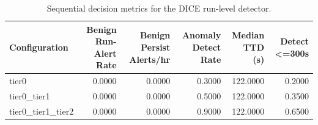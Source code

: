 \begin{table}[t]
\centering
\caption{Sequential decision metrics for the DICE run-level detector.}
\label{tab:dice_sequential_metrics}
\footnotesize
\begin{tabular}{lrrrrr}
\toprule
Configuration & Benign Run-Alert Rate & Benign Persist Alerts/hr & Anomaly Detect Rate & Median TTD (s) & Detect <=300s \\
\midrule
tier0 & 0.0000 & 0.0000 & 0.3000 & 122.0000 & 0.2000 \\
tier0_tier1 & 0.0000 & 0.0000 & 0.5000 & 122.0000 & 0.3500 \\
tier0_tier1_tier2 & 0.0000 & 0.0000 & 0.9000 & 122.0000 & 0.6500 \\
\bottomrule
\end{tabular}

\end{table}
